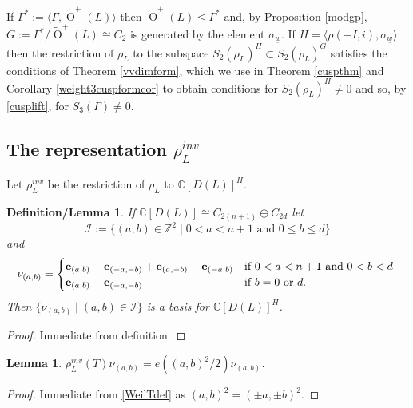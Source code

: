 \documentclass[12pt, a4paper]{article}
\newtheorem{lemma}[thm]{Lemma}
\newtheorem{deflem}[thm]{Definition/Lemma}
\newcommand{\CC}{\mathbb{C}}
\newcommand{\ZZ}{\mathbb{Z}}
\newcommand{\la}{\langle}
\newcommand{\ra}{\rangle}
\newcommand{\ic}{\mathcal{I}}
\newcommand{\opn}{\operatorname}
\newcommand{\op}{\oplus}
\begin{document}
If $\Gamma^* := \la \Gamma, \widetilde{\opn{O}}^+(L) \ra$ then $\widetilde{\opn{O}}^+(L) \trianglelefteq \Gamma^*$ and, by Proposition \ref{modgp}, $G:=\Gamma^*/\widetilde{\opn{O}}^+(L) \cong C_2$ is generated by the element $\sigma_{\underline{w}}$.
If $H = \la \rho(-I, i), \sigma_{\underline{w}} \ra$ then the restriction of $\rho_L$ to the subspace $S_2(\rho_L)^H \subset S_2(\rho_L)^G$  satisfies the conditions of Theorem \ref{vvdimform}, which we use in Theorem \ref{cuspthm} and Corollary \ref{weight3cuspformcor} to obtain conditions for $S_2(\rho_L)^H \neq 0$ and so, by  \eqref{cusplift}, for $S_3(\Gamma) \neq 0$. 
\subsection{The representation $\rho_L^{inv}$}
Let $\rho_L^{inv}$ be the restriction of $\rho_L$ to $\CC[D(L)]^H$.
\begin{deflem}\label{Hinvsdeflem}
    If $\CC[D(L)] \cong C_{2(n+1)} \op C_{2d}$ let 
    \[
    \ic := \{(a,b) \in \ZZ^2 \mid 0 < a < n+1 \text{ and } 0 \leq b \leq d \}
    \] 
    and
    \[
    \nu_{(a,b)} =
    \begin{cases}
      \bold{e}_{(a,b)}
      - \bold{e}_{(-a,-b)}
      + \bold{e}_{(a,-b)}
      - \bold{e}_{(-a,b)} & \text{if $0<a<n+1$ and $0<b<d$ } \\
      \bold{e}_{(a,b)} - \bold{e}_{(-a, -b)} & \text{if $b = 0$ or $d$}.
    \end{cases}
    \]
    Then $\{\nu_{(a,b)} \mid (a,b) \in \ic \}$ is a basis for $\CC[D(L)]^H$.
  \end{deflem}
  \begin{proof}
    Immediate from definition.
    \end{proof}
\begin{lemma}\label{rhoinvTlemma}
    $\rho_L^{inv}(T) \nu_{(a,b)} = e((a,b)^2/2) \nu_{(a,b)}$.
  \end{lemma}
  \begin{proof}
    Immediate from \eqref{WeilTdef} as $(a,b)^2 = (\pm a, \pm b)^2$.
  \end{proof}
\end{document}
